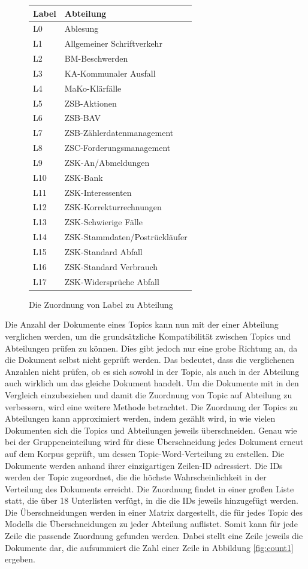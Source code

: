 \documentclass[german,version-2020-11]{uzl-thesis}
\begin{document}
\begin{figure}[h]
\begin{center}
\begin{tabular}{ll}
\hline
\hline
Label&Abteilung\\
\hline
L0&Ablesung\\
L1&Allgemeiner Schriftverkehr\\
L2&BM-Beschwerden\\
L3&KA-Kommunaler Ausfall\\
L4&MaKo-Klärfälle\\
L5&ZSB-Aktionen\\
L6&ZSB-BAV\\
L7&ZSB-Zählerdatenmanagement\\
L8&ZSC-Forderungsmanagement\\
L9&ZSK-An/Abmeldungen\\
L10&ZSK-Bank\\
L11&ZSK-Interessenten\\
L12&ZSK-Korrekturrechnungen\\
L13&ZSK-Schwierige Fälle\\
L14&ZSK-Stammdaten/Postrückläufer\\
L15&ZSK-Standard Abfall\\
L16&ZSK-Standard Verbrauch\\
L17&ZSK-Widersprüche Abfall\\
\hline
\hline
\end{tabular}
\caption{Die Zuordnung von Label zu Abteilung}
\label{fig:labels}
\end{center}
\end{figure}


Die Anzahl der Dokumente eines Topics kann nun mit der einer Abteilung verglichen werden, um die grundsätzliche Kompatibilität zwischen Topics und Abteilungen prüfen zu können. Dies gibt jedoch nur eine grobe Richtung an, da die Dokument selbst nicht geprüft werden. Das bedeutet, dass die verglichenen Anzahlen nicht prüfen, ob es sich sowohl in der Topic, als auch in der Abteilung auch wirklich um das gleiche Dokument handelt. Um die Dokumente mit in den Vergleich einzubeziehen und damit die Zuordnung von Topic auf Abteilung zu verbessern, wird eine weitere Methode betrachtet. Die Zuordnung der Topics zu Abteilungen kann approximiert werden, indem gezählt wird, in wie vielen Dokumenten sich die Topics und Abteilungen jeweils überschneiden. Genau wie bei der Gruppeneinteilung wird für diese Überschneidung jedes Dokument erneut auf dem Korpus geprüft, um dessen Topic-Word-Verteilung zu erstellen. Die Dokumente werden anhand ihrer einzigartigen Zeilen-ID adressiert. Die IDs werden der Topic zugeordnet, die die höchste Wahrscheinlichkeit in der Verteilung des Dokuments erreicht. Die Zuordnung findet in einer großen Liste statt, die über 18 Unterlisten verfügt, in die die IDs jeweils hinzugefügt werden. Die Überschneidungen werden in einer Matrix dargestellt, die für jedes Topic des Modells die Überschneidungen zu jeder Abteilung auflistet. Somit kann für jede Zeile die passende Zuordnung gefunden werden. Dabei stellt eine Zeile jeweils die Dokumente dar, die aufsummiert die Zahl einer Zeile in Abbildung \ref{fig:count1} ergeben. 
\end{document}
